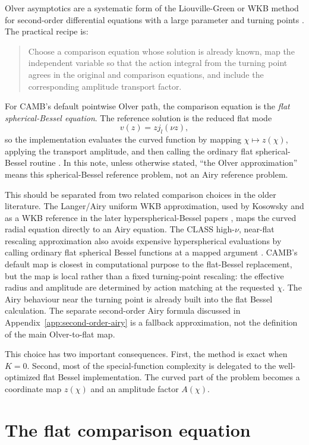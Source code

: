 \documentclass[11pt,a4paper]{article}
\newcommand{\code}[1]{\texttt{\detokenize{#1}}}
\begin{document}
Olver asymptotics are a systematic form of the Liouville-Green or WKB method for second-order differential equations with a large parameter and turning points \cite{olver}.  The practical recipe is:
\begin{quote}
Choose a comparison equation whose solution is already known, map the independent variable so that the action integral from the turning point agrees in the original and comparison equations, and include the corresponding amplitude transport factor.
\end{quote}
For CAMB's default pointwise Olver path, the comparison equation is the
\emph{flat spherical-Bessel equation}.  The reference solution is the reduced
flat mode
\[
  v(z)=zj_l(\nu z),
\]
so the implementation evaluates the curved function by mapping
\(\chi\mapsto z(\chi)\), applying the transport amplitude, and then calling
the ordinary flat spherical-Bessel routine \code{BJL}.  In this note, unless
otherwise stated, ``the Olver approximation'' means this spherical-Bessel
reference problem, not an Airy reference problem.

This should be separated from two related comparison choices in the older
literature.  The Langer/Airy uniform WKB approximation, used by Kosowsky and
as a WKB reference in the later hyperspherical-Bessel papers
\cite{kosowsky1998,tram2013,lesgourgues-tram2013}, maps the curved radial
equation directly to an Airy equation.  The \textsc{CLASS} high-\(\nu\),
near-flat rescaling approximation also avoids expensive hyperspherical
evaluations by calling ordinary flat spherical Bessel functions at a mapped
argument \cite{lesgourgues-tram2013}.  CAMB's default map is closest in
computational purpose to the flat-Bessel replacement, but the map is local
rather than a fixed turning-point rescaling: the effective radius and amplitude
are determined by action matching at the requested \(\chi\).  The Airy
behaviour near the turning point is already built into the flat Bessel
calculation.  The separate second-order Airy formula discussed in
Appendix~\ref{app:second-order-airy} is a fallback approximation, not the
definition of the main Olver-to-flat map.

This choice has two important consequences.  First, the method is exact when \(K=0\).  Second, most of the special-function complexity is delegated to the well-optimized flat Bessel implementation.  The curved part of the problem becomes a coordinate map \(z(\chi)\) and an amplitude factor \(A(\chi)\).

\section{The flat comparison equation}
\end{document}
